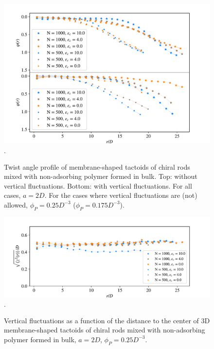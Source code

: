 \begin{figure}
\begin{center}
\includegraphics[width= .9\columnwidth]{figures/chapter-5/twistprofile}.
	\caption{Twist angle profile of membrane-shaped tactoids of chiral rods mixed with non-adsorbing polymer formed in bulk. Top: without vertical fluctuations. Bottom: with vertical fluctuations. For all cases, $a = 2D$. For the cases where vertical fluctuations are (not) allowed, $\phi_P=0.25D^{-3}$ ($\phi_P=0.175D^{-3}$). } %
\end{center}
\end{figure}


\begin{figure}
\begin{center}
\includegraphics[width= \columnwidth]{figures/chapter-5/zstd}.
	\caption{Vertical fluctuations as a function of the distance to the center of 3D membrane-shaped tactoids of chiral rods mixed with non-adsorbing polymer formed in bulk, $a = 2D$, $\phi_P=0.25D^{-3}$. } %
\end{center}
\end{figure}





